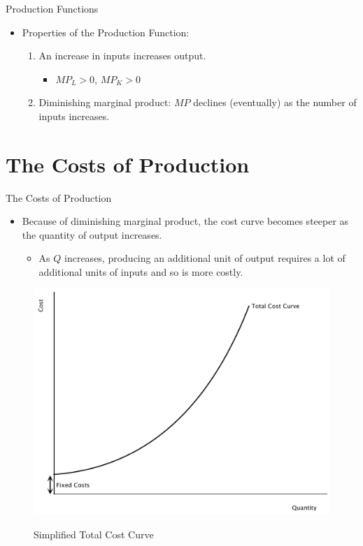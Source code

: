 \documentclass[xcolor={dvipsnames},pdf, hyperref={colorlinks=true, citecolor=ForestGreen, linkcolor=BlueViolet, urlcolor=Magenta}]{beamer}
\newcommand{\blank}[0]{}
\newcommand{\ddp}[1]{{\textcolor{ForestGreen}{#1}}}
\begin{document}
\begin{frame}{Production Functions}
	\begin{itemize}
		\item 	Properties of the Production Function:
		\begin{enumerate}
			\item An increase in inputs increases output.
			\begin{itemize}
				\item $MP_L > 0$, $MP_K > 0$
			\end{itemize}
			\item Diminishing marginal product: $MP$ declines (eventually) as the number of inputs increases.
		\end{enumerate}
	\end{itemize}
\end{frame}

\section{The Costs of Production}

\begin{frame}{The Costs of Production}
\begin{itemize}
	\item Because of diminishing marginal product, the cost curve becomes steeper as the quantity of output increases. 
	\begin{itemize}
	\item As $Q$ increases, producing an additional unit of output requires a lot of additional units of inputs and so is more costly.
	\end{itemize}
\end{itemize}
\blank \blank \blank \blank 
\begin{figure}[H]
	\centering
	\ddp{\includegraphics[scale=.3]{plot56.pdf}}
	\caption{Simplified Total Cost Curve}
\end{figure}
\end{frame}
\end{document}

